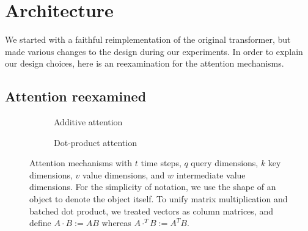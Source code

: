 \documentclass[11pt,twocolumn]{article}
\DeclareMathOperator{\softmax}{softmax}
\begin{document}
\section{Architecture}%
\label{sec:architecture}

We started with a faithful reimplementation of the original transformer,
but made various changes to the design during our experiments.
In order to explain our design choices,
here is an reexamination for the attention mechanisms.

\subsection{Attention reexamined}

\begin{figure}
  \begin{subfigure}{0.5\textwidth}
    \centering
    \caption*{Additive attention}
  \end{subfigure}%
  \begin{subfigure}{0.5\textwidth}
    \centering
    \caption*{Dot-product attention}
  \end{subfigure}
  \caption[]{\label{fig:attention}Attention mechanisms with
    \(t\) time steps, \(q\) query dimensions, \(k\) key dimensions,
    \(v\) value dimensions, and \(w\) intermediate value dimensions.
    For the simplicity of notation,
    we use the shape of an object to denote the object itself.
    To unify matrix multiplication and batched dot product,
    we treated vectors as column matrices,
    and define \(A \cdot B := A B\)
    whereas \(A \cdot^{T} B := A^{T} B\).}
\end{figure}
\end{document}
